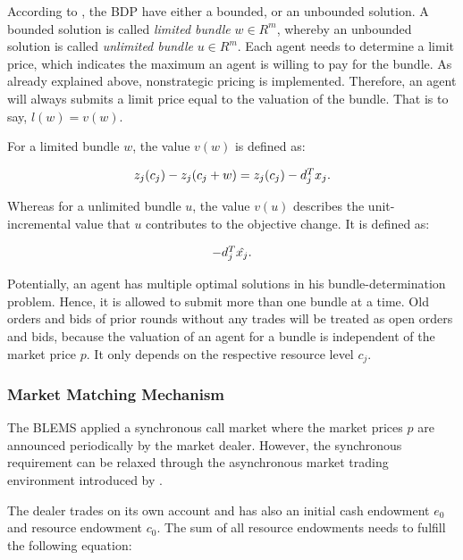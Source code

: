 According to , the BDP have either 
a bounded, or an unbounded solution. A bounded solution is called \textit{limited bundle} 
$w \in R^{m}$, whereby an unbounded solution is called \textit{unlimited bundle}
$u \in R^{m}$.
Each agent needs to determine a limit price, which indicates
the maximum an agent is willing to pay for the bundle. 
As already explained above, nonstrategic pricing is implemented. 
Therefore, an agent will always submits a limit price equal to the valuation of the bundle. That is to say, $l(w) = v(w)$.

For a limited bundle $w$, the value $v(w)$ is defined as:

\begin{equation*}
 \begin{array}{ll@{}ll}
 z_{j}(c_{j}) - z_{j}(c_{j} + w) = z_{j}(c_{j}) - d_{j}^{T}x_{j}.
 \end{array}
\end{equation*}

Whereas for a unlimited bundle $u$, the value $v(u)$ describes the 
unit-incremental value that $u$ contributes to the objective change. It is defined
as:

\begin{equation*}
 \begin{array}{ll@{}ll}
 -d_{j}^{T}\hat{x_{j}}.
 \end{array}
\end{equation*}

Potentially, an agent has multiple optimal solutions in his bundle-determination problem. Hence, it is allowed to submit more than
one bundle at a time. 
Old orders and bids of prior rounds without any trades will be treated 
as open orders and bids, because the valuation of an agent for a bundle is
independent of the market price $p$.
It only depends on the respective resource level $c_{j}$. 

\subsubsection{Market Matching Mechanism}
\label{sec:market_clearing_mechanism}
The BLEMS applied a synchronous call market where the market prices $p$ are announced periodically by the market dealer. 
However, the synchronous requirement can be relaxed through the 
asynchronous market trading environment introduced by  . 

The dealer trades on its own account and has also an 
initial cash endowment $e_{0}$ and resource endowment $c_{0}$.
The sum of all resource endowments needs to fulfill the following equation:


